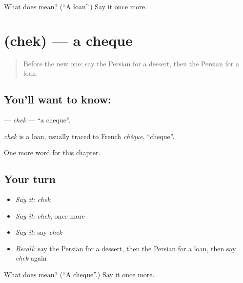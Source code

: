\begin{tcolorbox}[breakable,colback=teal!4,colframe=teal!35!black,title={Before you move on}]
What does  mean? (\textquotedblleft{}A loan\textquotedblright{}.) Say it once more.
\end{tcolorbox}
\section[\texorpdfstring{\fa{چک} (chek)}{چک (chek)}]{ (chek) — a cheque}

\label{lesson:FA-C242-chek}



\begin{quote}
Before the new one: say the Persian for a dessert, then the Persian for a loan.
\end{quote}

\subsection*{You'll want to know: }
\textbf{} — \emph{chek} — \textquotedblleft{}a cheque\textquotedblright{}.

\begin{cousinweb}
\emph{chek} is a loan, usually traced to French \emph{chèque}, \textquotedblleft{}cheque\textquotedblright{}.
\end{cousinweb}

\begin{grammarlens}[title={What you've built}]
One more word for this chapter.
\end{grammarlens}

\subsection*{Your turn}
\begin{itemize}
\raggedright
  \item \emph{Say it:} \emph{chek}
  \item \emph{Say it:} \emph{chek}, once more
  \item \emph{Say it:} say \emph{chek}
  \item \emph{Recall:} say the Persian for a dessert, then the Persian for a loan, then say \emph{chek} again
\end{itemize}

\begin{tcolorbox}[breakable,colback=teal!4,colframe=teal!35!black,title={Before you move on}]
What does  mean? (\textquotedblleft{}A cheque\textquotedblright{}.) Say it once more.
\end{tcolorbox}

